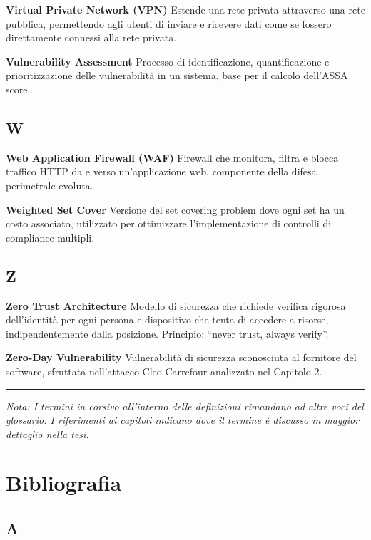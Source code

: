 \documentclass{report}
\begin{document}
\textbf{Virtual Private Network (VPN)} Estende una rete privata
attraverso una rete pubblica, permettendo agli utenti di inviare e
ricevere dati come se fossero direttamente connessi alla rete privata.

\textbf{Vulnerability Assessment} Processo di identificazione,
quantificazione e prioritizzazione delle vulnerabilità in un sistema,
base per il calcolo dell'ASSA score.

\subsection{W}\label{w}

\textbf{Web Application Firewall (WAF)} Firewall che monitora, filtra e
blocca traffico HTTP da e verso un'applicazione web, componente della
difesa perimetrale evoluta.

\textbf{Weighted Set Cover} Versione del set covering problem dove ogni
set ha un costo associato, utilizzato per ottimizzare l'implementazione
di controlli di compliance multipli.

\subsection{Z}\label{z}

\textbf{Zero Trust Architecture} Modello di sicurezza che richiede
verifica rigorosa dell'identità per ogni persona e dispositivo che tenta
di accedere a risorse, indipendentemente dalla posizione. Principio:
``never trust, always verify''.

\textbf{Zero-Day Vulnerability} Vulnerabilità di sicurezza sconosciuta
al fornitore del software, sfruttata nell'attacco Cleo-Carrefour
analizzato nel Capitolo 2.

\begin{center}\rule{0.5\linewidth}{0.5pt}\end{center}

\emph{Nota: I termini in corsivo all'interno delle definizioni rimandano
ad altre voci del glossario. I riferimenti ai capitoli indicano dove il
termine è discusso in maggior dettaglio nella tesi.}

\section{Bibliografia}\label{bibliografia-3}

\subsection{A}\label{a-1}
\end{document}
